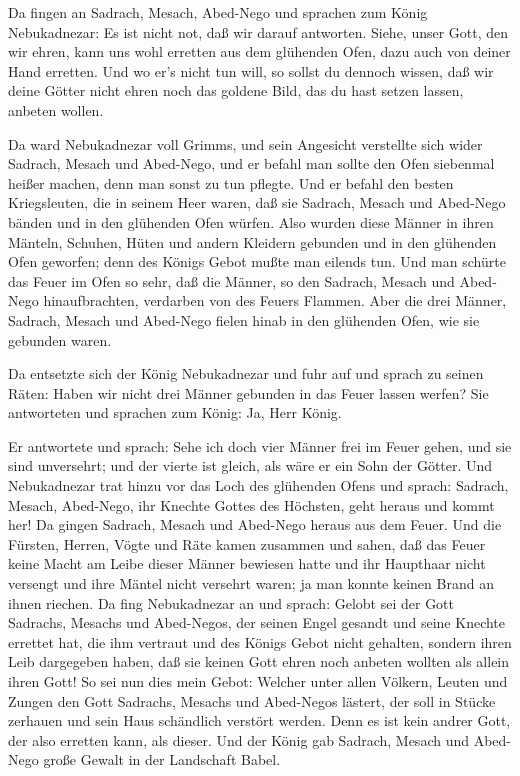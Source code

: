  Da fingen an Sadrach, Mesach, Abed-Nego und sprachen zum
König Nebukadnezar: Es ist nicht not, daß wir darauf antworten.
 Siehe, unser Gott, den wir ehren, kann uns wohl erretten
aus dem glühenden Ofen, dazu auch von deiner Hand erretten.
 Und wo er's nicht tun will, so sollst du dennoch wissen,
daß wir deine Götter nicht ehren noch das goldene Bild, das du hast
setzen lassen, anbeten wollen.

 Da ward Nebukadnezar voll Grimms, und sein Angesicht
verstellte sich wider Sadrach, Mesach und Abed-Nego, und er befahl man
sollte den Ofen siebenmal heißer machen, denn man sonst zu tun pflegte.
 Und er befahl den besten Kriegsleuten, die in seinem Heer
waren, daß sie Sadrach, Mesach und Abed-Nego bänden und in den glühenden
Ofen würfen.  Also wurden diese Männer in ihren Mänteln,
Schuhen, Hüten und andern Kleidern gebunden und in den glühenden Ofen
geworfen;  denn des Königs Gebot mußte man eilends tun. Und
man schürte das Feuer im Ofen so sehr, daß die Männer, so den Sadrach,
Mesach und Abed-Nego hinaufbrachten, verdarben von des Feuers Flammen.
 Aber die drei Männer, Sadrach, Mesach und Abed-Nego fielen
hinab in den glühenden Ofen, wie sie gebunden waren.

 Da entsetzte sich der König Nebukadnezar und fuhr auf und
sprach zu seinen Räten: Haben wir nicht drei Männer gebunden in das
Feuer lassen werfen? Sie antworteten und sprachen zum König: Ja, Herr
König.

 Er antwortete und sprach: Sehe ich doch vier Männer frei
im Feuer gehen, und sie sind unversehrt; und der vierte ist gleich, als
wäre er ein Sohn der Götter.  Und Nebukadnezar trat hinzu
vor das Loch des glühenden Ofens und sprach: Sadrach, Mesach, Abed-Nego,
ihr Knechte Gottes des Höchsten, geht heraus und kommt her! Da gingen
Sadrach, Mesach und Abed-Nego heraus aus dem Feuer.  Und
die Fürsten, Herren, Vögte und Räte kamen zusammen und sahen, daß das
Feuer keine Macht am Leibe dieser Männer bewiesen hatte und ihr
Haupthaar nicht versengt und ihre Mäntel nicht versehrt waren; ja man
konnte keinen Brand an ihnen riechen.  Da fing Nebukadnezar
an und sprach: Gelobt sei der Gott Sadrachs, Mesachs und Abed-Negos, der
seinen Engel gesandt und seine Knechte errettet hat, die ihm vertraut
und des Königs Gebot nicht gehalten, sondern ihren Leib dargegeben
haben, daß sie keinen Gott ehren noch anbeten wollten als allein ihren
Gott!  So sei nun dies mein Gebot: Welcher unter allen
Völkern, Leuten und Zungen den Gott Sadrachs, Mesachs und Abed-Negos
lästert, der soll in Stücke zerhauen und sein Haus schändlich verstört
werden. Denn es ist kein andrer Gott, der also erretten kann, als
dieser.  Und der König gab Sadrach, Mesach und Abed-Nego
große Gewalt in der Landschaft Babel.

